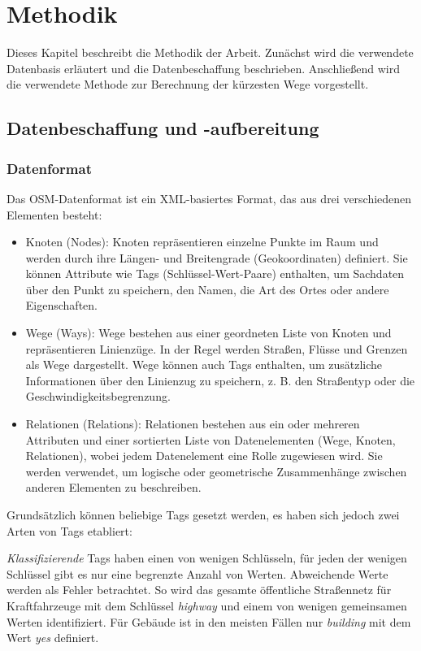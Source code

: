 \section{Methodik}
Dieses Kapitel beschreibt die Methodik der Arbeit. Zunächst wird die verwendete Datenbasis erläutert
und die Datenbeschaffung beschrieben. Anschließend wird die verwendete Methode zur Berechnung der
kürzesten Wege vorgestellt.

\subsection{Datenbeschaffung und -aufbereitung}

\subsubsection{Datenformat}
Das \ac{OSM}-Datenformat ist ein XML-basiertes Format, das aus drei verschiedenen Elementen besteht:
\begin{itemize}
    \item Knoten (Nodes): Knoten repräsentieren einzelne Punkte im Raum und werden durch ihre
          Längen- und Breitengrade (Geokoordinaten) definiert. Sie können Attribute wie Tags
          (Schlüssel-Wert-Paare) enthalten, um Sachdaten über den Punkt zu speichern, \zB den
          Namen, die Art des Ortes oder andere Eigenschaften.

    \item Wege (Ways): Wege bestehen aus einer geordneten Liste von Knoten und repräsentieren
          Linienzüge. In der Regel werden Straßen, Flüsse und Grenzen als Wege dargestellt. Wege
          können auch Tags enthalten, um zusätzliche Informationen über den Linienzug zu speichern,
          z. B. den Straßentyp oder die Geschwindigkeitsbegrenzung.

    \item Relationen (Relations): Relationen bestehen aus ein oder mehreren Attributen und einer
          sortierten Liste von Datenelementen (Wege, Knoten, Relationen), wobei  jedem Datenelement
          eine Rolle zugewiesen wird. Sie werden verwendet, um logische oder geometrische
          Zusammenhänge zwischen anderen Elementen zu beschreiben.
\end{itemize}
Grundsätzlich können beliebige Tags gesetzt werden, es haben sich jedoch zwei Arten von Tags
etabliert:

\emph{Klassifizierende} Tags haben einen von wenigen Schlüsseln, für jeden der wenigen Schlüssel
gibt es nur eine begrenzte Anzahl von Werten. Abweichende Werte werden als Fehler betrachtet. So
wird das gesamte öffentliche Straßennetz für Kraftfahrzeuge mit dem Schlüssel \emph{highway} und
einem von wenigen gemeinsamen Werten identifiziert. Für Gebäude ist in den meisten Fällen nur
\emph{building} mit dem Wert \emph{yes} definiert.

